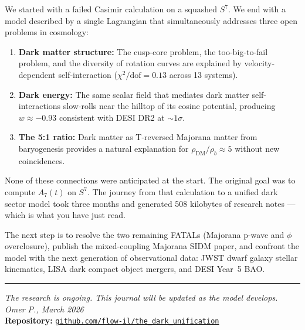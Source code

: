 \documentclass[12pt, a4paper]{article}
\begin{document}
We started with a failed Casimir calculation on a squashed $S^7$. We end with a model described by a single Lagrangian that simultaneously addresses three open problems in cosmology:

\begin{enumerate}
  \item \textbf{Dark matter structure:} The cusp-core problem, the too-big-to-fail problem, and the diversity of rotation curves are explained by velocity-dependent self-interaction ($\chi^2/\text{dof} = 0.13$ across 13 systems).

  \item \textbf{Dark energy:} The same scalar field that mediates dark matter self-interactions slow-rolls near the hilltop of its cosine potential, producing $w \approx -0.93$ consistent with DESI DR2 at $\sim 1\sigma$.

  \item \textbf{The 5:1 ratio:} Dark matter as T-reversed Majorana matter from baryogenesis provides a natural explanation for $\rho_\text{DM}/\rho_b \approx 5$ without new coincidences.

\end{enumerate}

None of these connections were anticipated at the start. The original goal was to compute $A_7(t)$ on $S^7$. The journey from that calculation to a unified dark sector model took three months and generated 508 kilobytes of research notes --- which is what you have just read.

The next step is to resolve the two remaining FATALs (Majorana p-wave and $\phi$ overclosure), publish the mixed-coupling Majorana SIDM paper, and confront the model with the next generation of observational data: JWST dwarf galaxy stellar kinematics, LISA dark compact object mergers, and DESI Year~5 BAO.

\medskip\noindent\hrule\medskip

\begin{center}
\small\color{journalgray}
\textit{The research is ongoing. This journal will be updated as the model develops.}\\[0.3em]
\textit{Omer P., March 2026}\\[0.3em]
\textbf{Repository:} \href{https://github.com/flow-il/the_dark_unification}{\texttt{github.com/flow-il/the\_dark\_unification}}
\end{center}

\newpage

\appendix
\end{document}
